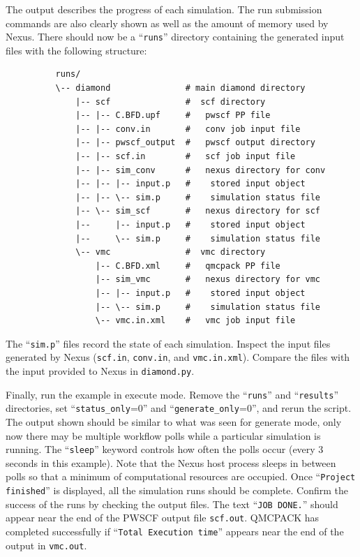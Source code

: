 \documentclass[oneside,11pt]{memoir}
\numberwithin{equation}{section}
\begin{document}
{\flushleft
The output describes the progress of each simulation.  The run submission commands are also clearly shown as well as the amount of memory used by Nexus.
There should now be a ``\texttt{runs}'' directory containing the generated input files with the following structure:
}
\begin{shaded}
\begin{verbatim}
          runs/
          \-- diamond               # main diamond directory
              |-- scf               #  scf directory
              |-- |-- C.BFD.upf     #   pwscf PP file
              |-- |-- conv.in       #   conv job input file
              |-- |-- pwscf_output  #   pwscf output directory
              |-- |-- scf.in        #   scf job input file
              |-- |-- sim_conv      #   nexus directory for conv
              |-- |-- |-- input.p   #    stored input object
              |-- |-- \-- sim.p     #    simulation status file
              |-- \-- sim_scf       #   nexus directory for scf
              |--     |-- input.p   #    stored input object
              |--     \-- sim.p     #    simulation status file
              \-- vmc               #  vmc directory
                  |-- C.BFD.xml     #   qmcpack PP file
                  |-- sim_vmc       #   nexus directory for vmc
                  |-- |-- input.p   #    stored input object
                  |-- \-- sim.p     #    simulation status file
                  \-- vmc.in.xml    #   vmc job input file
\end{verbatim}
\end{shaded}
{\flushleft
The ``\texttt{sim.p}'' files record the state of each simulation.  Inspect the input files generated by Nexus (\texttt{scf.in}, \texttt{conv.in}, and \texttt{vmc.in.xml}).  Compare the files with the input provided to Nexus in \texttt{diamond.py}.
}

Finally, run the example in execute mode. Remove the ``\texttt{runs}'' and ``\texttt{results}'' directories, set ``\texttt{status\_only}=0'' and ``\texttt{generate\_only}=0'', and rerun the script.  The output shown should be similar to what was seen for generate mode, only now there may be multiple workflow polls while a particular simulation is running.  The ``\texttt{sleep}'' keyword controls how often the polls occur (every 3 seconds in this example).  Note that the Nexus host process sleeps in between polls so that a minimum of computational resources are occupied.  Once ``\texttt{Project finished}'' is displayed, all the simulation runs should be complete.  Confirm the success of the runs by checking the output files.  The text ``\texttt{JOB DONE.}'' should appear near the end of the PWSCF output file \texttt{scf.out}.  QMCPACK has completed successfully if ``\texttt{Total Execution time}'' appears near the end of the output in \texttt{vmc.out}.
\end{document}

